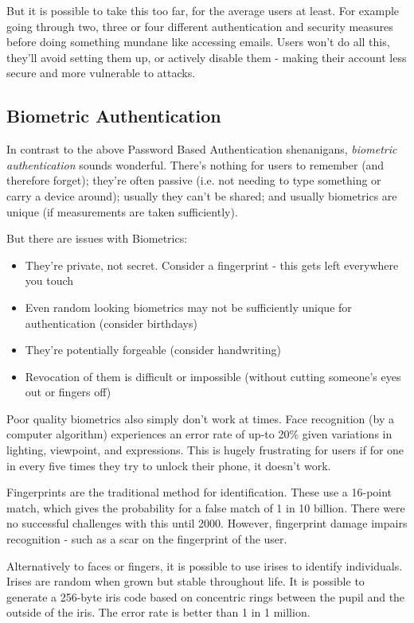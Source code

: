But it is possible to take this too far, for the average users at least. For example going through two, three or four different authentication and security measures before doing something mundane like accessing emails. Users won't do all this, they'll avoid setting them up, or actively disable them - making their account less secure and more vulnerable to attacks. 

\subsection{Biometric Authentication}
In contrast to the above Password Based Authentication shenanigans, \textit{biometric authentication} sounds wonderful. There's nothing for users to remember (and therefore forget); they're often passive (i.e. not needing to type something or carry a device around); usually they can't be shared; and usually biometrics are unique (if measurements are taken sufficiently). 

But there are issues with Biometrics:
\begin{itemize}
    \item They're private, not secret. Consider a fingerprint - this gets left everywhere you touch
    \item Even random looking biometrics may not be sufficiently unique for authentication (consider birthdays)
    \item They're potentially forgeable (consider handwriting)
    \item Revocation of them is difficult or impossible (without cutting someone's eyes out or fingers off)
\end{itemize}

Poor quality biometrics also simply don't work at times. Face recognition (by a computer algorithm) experiences an error rate of up-to 20\% given variations in lighting, viewpoint, and expressions. This is hugely frustrating for users if for one in every five times they try to unlock their phone, it doesn't work.

Fingerprints are the traditional method for identification. These use a 16-point match, which gives the probability for a false match of 1 in 10 billion. There were no successful challenges with this until 2000. However, fingerprint damage impairs recognition - such as a scar on the fingerprint of the user. 

Alternatively to faces or fingers, it is possible to use irises to identify individuals. Irises are random when grown but stable throughout life. It is possible to generate a 256-byte iris code based on concentric rings between the pupil and the outside of the iris. The error rate is better than 1 in 1 million. 


